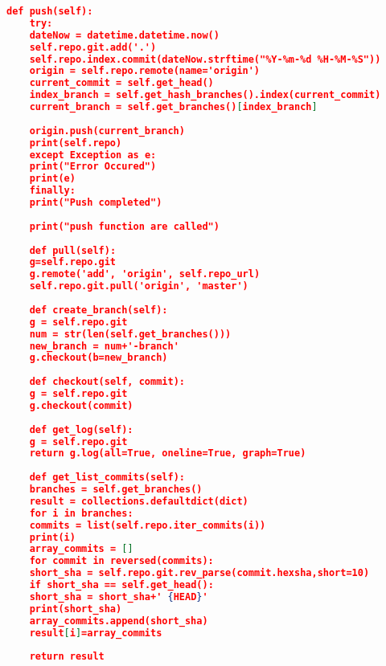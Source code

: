 \begin{lstlisting}[frame=single,tabsize=2,breaklines,caption={Kode sumber ApplicationRepo.py},label=applicationrepo, captionpos=b, language=json]
	def push(self):
	try:
	dateNow = datetime.datetime.now()
	self.repo.git.add('.')
	self.repo.index.commit(dateNow.strftime("%Y-%m-%d %H-%M-%S"))
	origin = self.repo.remote(name='origin')
	current_commit = self.get_head()
	index_branch = self.get_hash_branches().index(current_commit)
	current_branch = self.get_branches()[index_branch]
	
	origin.push(current_branch)
	print(self.repo)
	except Exception as e:
	print("Error Occured")
	print(e)
	finally:
	print("Push completed")
	
	print("push function are called")
	
	def pull(self):
	g=self.repo.git
	g.remote('add', 'origin', self.repo_url)
	self.repo.git.pull('origin', 'master')
	
	def create_branch(self):
	g = self.repo.git
	num = str(len(self.get_branches()))
	new_branch = num+'-branch'
	g.checkout(b=new_branch)
	
	def checkout(self, commit):
	g = self.repo.git
	g.checkout(commit)
	
	def get_log(self):
	g = self.repo.git
	return g.log(all=True, oneline=True, graph=True)
	
	def get_list_commits(self):
	branches = self.get_branches()
	result = collections.defaultdict(dict)
	for i in branches:
	commits = list(self.repo.iter_commits(i))
	print(i)
	array_commits = []
	for commit in reversed(commits):
	short_sha = self.repo.git.rev_parse(commit.hexsha,short=10)
	if short_sha == self.get_head():
	short_sha = short_sha+' {HEAD}'
	print(short_sha)
	array_commits.append(short_sha)
	result[i]=array_commits
	
	return result
	
	\end{lstlisting}